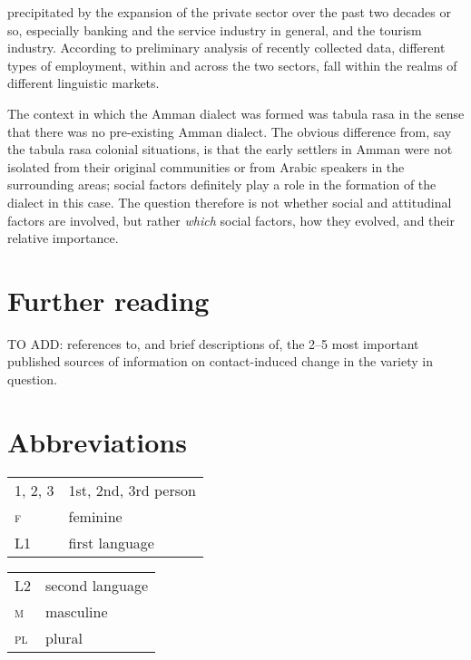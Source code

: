 \documentclass[output=paper]{langsci/langscibook}
\begin{document}
precipitated by the expansion of the private sector over the past two decades or so, especially banking and the service industry in general, and the tourism industry. According to preliminary analysis of recently collected data, different types of employment, within and across the two sectors, fall within the realms of different linguistic markets.

The context in which the Amman dialect was formed was tabula rasa in the sense that there was no pre-existing Amman dialect. The obvious difference from, say the tabula rasa colonial situations, is that the early settlers in Amman were not isolated from their original communities or from Arabic speakers in the surrounding areas; social factors definitely play a role in the formation of the dialect in this case. The question therefore is not whether social and attitudinal factors are involved, but rather \textit{which} social factors, how they evolved, and their relative importance.

\section*{Further reading}

TO ADD: references to, and brief descriptions of, the 2–5 most important published sources of information on contact-induced change in the variety in question.


\section*{Abbreviations}

\begin{tabularx}{.45\textwidth}{lQ}
\textsc{1, 2, 3} & 1st, 2nd, 3rd person \\
\textsc{f}  &  feminine\\
L1 & first language \\
\end{tabularx}
\begin{tabularx}{.45\textwidth}{lQ}
L2 & second language \\
\textsc{m}  &  masculine\\
\textsc{pl}  &  plural\\
\end{tabularx}
\end{document}
